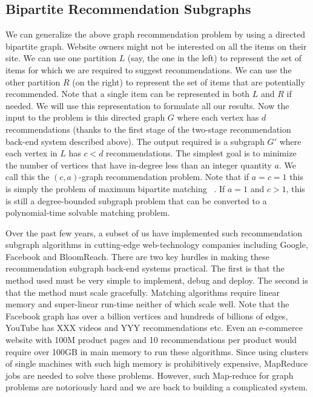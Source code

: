 \subsection{Bipartite Recommendation Subgraphs}

We can generalize the above graph recommendation problem by using a directed
bipartite graph. Website owners might not be interested on all the items on
their site. We can use one partition $L$ (say, the one in the left) to represent
the set of items for which we are required  to suggest recommendations. We can
use the other partition $R$ (on the right) to represent the set of items that
are potentially recommended. Note that a single item can be represented in both
$L$ and $R$ if needed. We will use this representation to formulate all our
results. Now the input to the problem is this directed graph $G$ where each
vertex has $d$ recommendations (thanks to the first stage of the two-stage
recommendation back-end system described above). The output required is a
subgraph $G'$ where each vertex in $L$ has $c < d$ recommendations. The simplest
goal is to minimize the number of vertices that have in-degree less than an
integer quantity $a$. We call this the $(c, a)$-graph recommendation problem.
Note that if $a=c=1$ this is simply the problem of maximum bipartite matching
~\cite{LovaszPlummer}. If $a=1$ and $c > 1$, this is still a degree-bounded
subgraph problem that can be converted to a polynomial-time solvable matching
problem. \vs

Over the past few years, a subset of us have implemented such recommendation
subgraph algorithms in cutting-edge web-technology companies including Google,
Facebook and BloomReach. There are two key hurdles in making these
recommendation subgraph back-end systems practical. The first is that the method
used must be very simple to implement, debug and deploy. The second is that the
method must scale gracefully.  Matching algorithms require linear memory and
super-linear run-time neither of which scale well. Note that the Facebook graph
has over a billion vertices\cite{} and hundreds of billions of edges\cite{},
YouTube has XXX videos and YYY recommendations\cite{} etc. Even an e-commerce
website with 100M product pages and 10 recommendations per product would require
over 100GB in main memory to run these algorithms. Since using clusters of
single machines with such high memory is prohibitively expensive, MapReduce
\cite{} jobs are needed to solve these problems. However, such Map-reduce for
graph problems are notoriously hard and we are back to building a complicated
system. \vs

